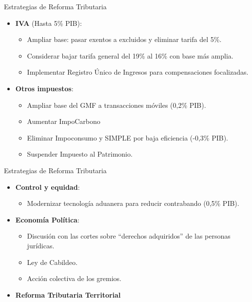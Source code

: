 \begin{frame}{Estrategias de Reforma Tributaria}
\begin{itemize}
    \item \textbf{IVA} ({Hasta \raisebox{0.2ex}{\texttildelow}}5\% PIB):
    \begin{itemize}
        \item Ampliar base: pasar exentos a excluidos y eliminar tarifa del 5\%.
        \item Considerar bajar tarifa general del 19\% al 16\% con base más amplia.
        \item Implementar Registro Único de Ingresos para compensaciones focalizadas.
    \end{itemize}
    \item \textbf{Otros impuestos}:
    \begin{itemize}
        \item Ampliar base del GMF a transacciones móviles (0,2\% PIB).
        \item Aumentar ImpoCarbono %
        \item Eliminar Impoconsumo y SIMPLE por baja eficiencia (-0,3\% PIB).
        \item Suspender Impuesto al Patrimonio.
    \end{itemize}
\end{itemize}
\end{frame}



\begin{frame}{Estrategias de Reforma Tributaria}
\begin{itemize}    
    \item \textbf{Control y equidad}:
    \begin{itemize}
        \item Modernizar tecnología aduanera para reducir contrabando (0,5\% PIB).
    \end{itemize}
    \item \textbf{Economía Política}:
    \begin{itemize}    
        \item Discusión con las cortes sobre ``derechos adquiridos'' de las personas jurídicas.
        \item Ley de Cabildeo.
        \item Acción colectiva de los gremios.
    \end{itemize}
    \item \textbf{Reforma Tributaria Territorial}
\end{itemize}
\end{frame}
